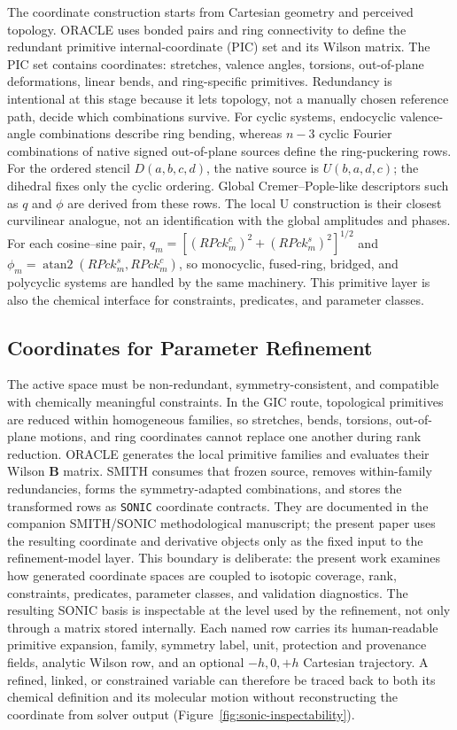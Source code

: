 \documentclass[aip,jcp,reprint,longbibliography,floatfix]{revtex4-2}
\begin{document}
The coordinate construction starts from Cartesian geometry and perceived
topology. ORACLE uses bonded pairs and ring connectivity to define the
redundant primitive internal-coordinate (PIC) set and its Wilson matrix. The
PIC set contains
coordinates:  stretches, valence angles, torsions, out-of-plane deformations,
linear bends, and ring-specific primitives. Redundancy is intentional at this
stage because it lets topology, not a manually chosen reference path, decide
which combinations survive. For cyclic systems, endocyclic valence-angle
combinations describe ring bending, whereas \(n-3\) cyclic Fourier
combinations of native signed out-of-plane sources define the ring-puckering
rows. For the ordered stencil \(D(a,b,c,d)\), the native source is
\(U(b,a,d,c)\); the dihedral fixes only the cyclic ordering. Global
Cremer--Pople-like descriptors such as $q$ and $\phi$ are derived from these
rows. The local U construction is their closest curvilinear analogue, not an
identification with the global amplitudes and phases.  For each cosine--sine
pair, \(q_m=[(RPck_m^c)^2+(RPck_m^s)^2]^{1/2}\) and
\(\phi_m=\operatorname{atan2}(RPck_m^s,RPck_m^c)\), so
monocyclic, fused-ring, bridged, and polycyclic systems are handled by the
same machinery.\cite{CremerPople1975} This
primitive layer is also the chemical interface for constraints, predicates,
and parameter classes.


\subsection{Coordinates for Parameter Refinement}

The active space must be non-redundant, symmetry-consistent, and compatible
with chemically meaningful constraints. In the GIC route, topological
primitives are reduced within homogeneous families, so stretches, bends,
torsions, out-of-plane motions, and ring coordinates cannot replace one
another during rank reduction.\cite{PulayFogarasi1992,Peng1996Redundant,Baker1996Delocalized,BakkenHelgaker2002,Marenich2025GIC}
ORACLE generates the local primitive families and evaluates their Wilson
$\mathbf{B}$ matrix. SMITH consumes that frozen source, removes within-family
redundancies, forms the symmetry-adapted combinations, and stores the
transformed rows as \texttt{SONIC} coordinate contracts. They are documented in
the companion SMITH/SONIC methodological manuscript;\cite{Barone2026SONIC}
the present paper uses the resulting coordinate and derivative objects only as
the fixed input to the refinement-model layer. This boundary is deliberate: the
present work examines how generated coordinate spaces are coupled to isotopic
coverage, rank, constraints, predicates, parameter classes, and validation
diagnostics.
The resulting SONIC basis is inspectable at the level used by the refinement,
not only through a matrix stored internally.  Each named row carries its
human-readable primitive expansion, family, symmetry label, unit, protection
and provenance fields, analytic Wilson row, and an optional $-h,0,+h$
Cartesian trajectory.  A refined, linked, or constrained variable can
therefore be traced back to both its chemical definition and its molecular
motion without reconstructing the coordinate from solver output
(Figure~\ref{fig:sonic-inspectability}).
\end{document}
